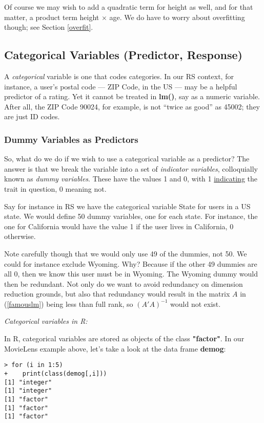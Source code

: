 Of course we may wish to add a quadratic term for height as well, and
for that matter, a product term height $\times$ age.  We do have to
worry about overfitting though; see Section \ref{overfit}.

\subsection{Categorical Variables (Predictor, Response)}

A \textit{categorical} variable is one that codes categories.  In our RS
context, for instance, a user's postal code --- ZIP Code, in the US ---
may be a helpful predictor of a rating.  Yet it cannot be treated in
\textbf{lm()}, say as a numeric variable.  After all, the ZIP Code
90024, for example, is not ``twice as good'' as 45002; they are just ID
codes.

\subsubsection{Dummy Variables as Predictors}

So, what do we do if we wish to use a categorical variable as a
predictor?  The answer is that we break the variable into a set of
\textit{indicator variables}, colloquially known as \textit{dummy
variables}.  These have the values 1 and 0, with 1
\underline{indicating} the trait in question, 0 meaning not.

Say for instance in RS we have the categorical variable State for users
in a US state.  We would define 50 dummy variables, one for each state.
For instance, the one for California would have the value 1 if the user
lives in California, 0 otherwise.

Note carefully though that we would only use 49 of the dummies, not 50.
We could for instance exclude Wyoming.  Why? Because if the other 49
dummies are all 0, then we know this user must be in Wyoming.  The
Wyoming dummy would then be redundant. Not only do we want to avoid
redundancy on dimension reduction grounds, but also that redundancy
would result in the matrix $A$ in (\ref{famouslm}) being less than full
rank, so $(A'A)^{-1}$ would not exist.

\textit{Categorical variables in R:}

In R, categorical variables are stored as objects of the class
\textbf{"factor"}.  In our MovieLens example above, let's take a look at
the data frame \textbf{demog}:

\begin{lstlisting}
> for (i in 1:5) 
+    print(class(demog[,i]))
[1] "integer"
[1] "integer"
[1] "factor"
[1] "factor"
[1] "factor"
\end{lstlisting}

